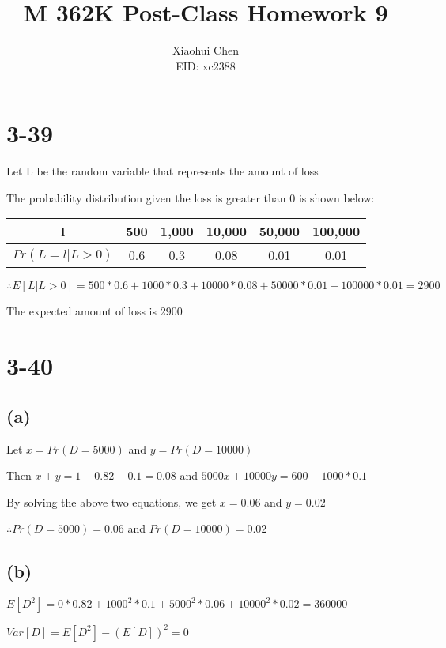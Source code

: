 \documentclass[12pt]{article}
\author{Xiaohui Chen \\EID: xc2388}
\title{M 362K Post-Class Homework 9}
\begin{document}
\maketitle
\begin{spacing}{2.0}

\section*{3-39}

Let L be the random variable that represents the amount of loss

The probability distribution given the loss is greater than 0 is shown below:

\begin{tabular}{|c|c|c|c|c|c|}
  \hline
  l & 500 & 1,000 & 10,000 & 50,000 & 100,000 \\
  \hline
  $Pr(L=l|L>0)$ & 0.6 & 0.3 & 0.08 & 0.01 & 0.01 \\
  \hline
\end{tabular}

$\therefore E[L|L>0]= 500*0.6+ 1000*0.3 + 10000*0.08 + 50000*0.01 +100000*0.01=2900$

The expected amount of loss is 2900

\section*{3-40}

\subsection*{(a)}

Let $x=Pr(D=5000)$ and $y=Pr(D=10000)$

Then $x+y=1-0.82-0.1=0.08$ and $5000x+10000y=600-1000*0.1$

By solving the above two equations, we get $x=0.06$ and $y=0.02$

$\therefore Pr(D=5000)=0.06$ and $Pr(D=10000)=0.02$

\subsection*{(b)}

$E[D^2]= 0*0.82+ 1000^2*0.1+ 5000^2*0.06 + 10000^2*0.02 = 360000$

$Var[D]= E[D^2]-(E[D])^2= 0$


\end{spacing}
\end{document}
